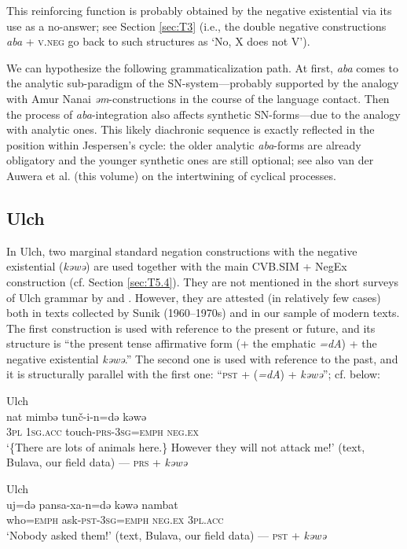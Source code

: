 \documentclass[output=paper]{langscibook}
\begin{document}
This reinforcing function is probably obtained by the negative existential via its use as a no-answer; see Section \ref{sec:T3} (i.e., the double negative constructions \textit{aba} + \textsc{v.neg} go back to such structures as ‘No, X does not V’).

We can hypothesize the following grammaticalization path. At first, \textit{aba} comes to the analytic sub-paradigm of the SN-system—probably supported by the analogy with Amur Nanai \textit{əm}-constructions in the course of the language contact. Then the process of \textit{aba}-integration also affects synthetic SN-forms—due to the analogy with analytic ones. This likely diachronic sequence is exactly reflected in the position within Jespersen’s cycle: the older analytic \textit{aba}-forms are already obligatory and the younger synthetic ones are still optional; see also van der Auwera et al. (this volume) on the intertwining of cyclical processes.

\subsection{Ulch}\label{sec:T6.2}

In Ulch, two marginal standard negation constructions with the negative existential (\textit{kəwə}) are used together with the main CVB.SIM + NegEx construction (cf. Section \ref{sec:T5.4}). They are not mentioned in the short surveys of Ulch grammar by \citet{petrova1936a} and \citet{sunik1985a}. However, they are attested (in relatively few cases) both in texts collected by Sunik (1960–1970s) and in our sample of modern texts. The first construction is used with reference to the present or future, and its structure is “the present tense affirmative form (+ the emphatic \textit{=dA}) + the negative existential \textit{kəwə}.” The second one is used with reference to the past, and it is structurally parallel with the first one: “\textsc{pst} + (\textit{=dA}) + \textit{kəwə}”; cf. below:

\ea Ulch \label{ex:T28}\\
	\gll nat	mimbə	tunč-i-n=də	kəwə\\
	\textsc{3pl}	\textsc{1sg.acc}	touch-\textsc{prs-3sg=emph}	\textsc{neg.ex}\\
	\glt `\{There are lots of animals here.\} However they will not attack me!' (text, Bulava, our field data) — \textsc{prs} + \textit{kəwə}
\z

\ea Ulch \label{ex:T29}\\
	\gll uj=də	pansa-xa-n=də	kəwə	nambat\\
	who=\textsc{emph}	ask-\textsc{pst-3sg=emph}	\textsc{neg.ex}	\textsc{3pl.acc}\\
	\glt `Nobody asked them!' (text, Bulava, our field data) — \textsc{pst} + \textit{kəwə}
\z
\end{document}
